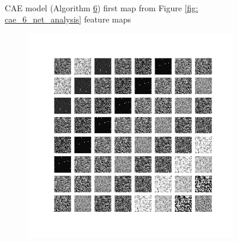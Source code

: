 \begin{figure}
\begin{subfigure}[b]{0.40\linewidth}
    \end{subfigure}
    \\[-0.5cm]
    \caption{CAE model (Algorithm \hyperref[tab: app_evalalgorithms]{6}) first map from Figure \ref{fig: cae_6_net_analysis} feature maps}
    \label{fig: cae_6_feature_maps_1}
\end{figure}

\begin{figure}
    \centering
    \begin{subfigure}[b]{0.4\linewidth}
        \includegraphics[width=\linewidth]{images/cae_online_lstm/caelstm_section_cae_training_uniform_random_fill_10000_model_feature_maps_map_1_0_3.png}
    \end{subfigure}
    \hfill
    \begin{subfigure}[b]{0.4\linewidth}

\end{subfigure}
\end{figure}
